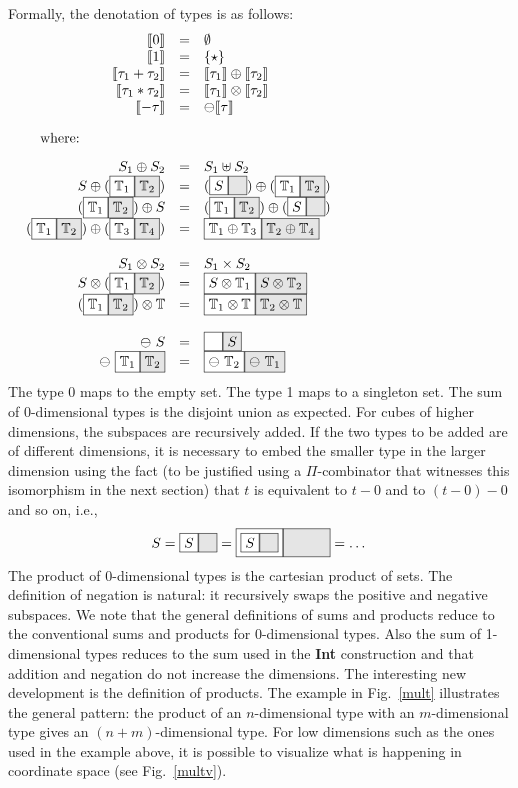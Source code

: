 \documentclass[authoryear,preprint]{sigplanconf}
\newcommand{\cubt}{\mathbb{T}}
\newcommand{\den}[1]{\llbracket #1 \rrbracket}
\newcommand{\nodet}[2]{\fcolorbox{black}{white}{$#1$}\fcolorbox{black}{gray!20}{$#2$}}
\begin{document}
Formally, the denotation of types is as follows:
\[\begin{array}{rcl}
\den{0} &=& \emptyset \\
\den{1} &=& \{ \star \} \\
\den{\tau_1 + \tau_2} &=& \den{\tau_1} \oplus \den{\tau_2} \\
\den{\tau_1 * \tau_2} &=& \den{\tau_1} \otimes \den{\tau_2} \\
\den{- \tau} &=& \ominus \den{\tau} \\
\\
\noalign{\mbox{where:}\hfill}
\\
S_1 \oplus S_2 &=& S_1 \uplus S_2 \\
S \oplus (\nodet{\cubt_1}{\cubt_2}) &=& 
  (\nodet{S}{\phantom{S}}) \oplus (\nodet{\cubt_1}{\cubt_2}) \\
(\nodet{\cubt_1}{\cubt_2}) \oplus S &=& 
  (\nodet{\cubt_1}{\cubt_2}) \oplus (\nodet{S}{\phantom{S}}) \\
(\nodet{\cubt_1}{\cubt_2}) \oplus (\nodet{\cubt_3}{\cubt_4}) &=& 
  \nodet{\cubt_1 \oplus \cubt_3}{\cubt_2 \oplus \cubt_4} \\
\\
S_1 \otimes S_2 &=& S_1 \times S_2 \\
S \otimes (\nodet{\cubt_1}{\cubt_2}) &=& 
  \nodet{S \otimes \cubt_1}{S \otimes \cubt_2} \\
(\nodet{\cubt_1}{\cubt_2}) \otimes \cubt &=& 
  \nodet{\cubt_1 \otimes \cubt}{\cubt_2 \otimes \cubt} \\
\\
\ominus~S &=& \nodet{\phantom{S}}{S} \\
\ominus~\nodet{\cubt_1}{\cubt_2} &=& \nodet{\ominus~\cubt_2}{\ominus~\cubt_1} 
\end{array}\]
The type 0 maps to the empty set. The type 1 maps to a singleton set. The sum
of $0$-dimensional types is the disjoint union as expected. For cubes of
higher dimensions, the subspaces are recursively added. If the two types to
be added are of different dimensions, it is necessary to embed the smaller
type in the larger dimension using the fact (to be justified using a
$\Pi$-combinator that witnesses this isomorphism in the next section) that
$t$ is equivalent to $t-0$ and to $(t-0)-0$ and so on, i.e.,
\[
S = \nodet{S}{\phantom{S}} = 
  \nodet{\nodet{S}{\phantom{S}}}
        {\phantom{{\nodet{S}{\phantom{S}}}}} = \ldots \\
\]
The product of 0-dimensional types is the cartesian product of sets. The
definition of negation is natural: it recursively swaps the positive and
negative subspaces. We note that the general definitions of sums and products
reduce to the conventional sums and products for $0$-dimensional types. Also
the sum of 1-dimensional types reduces to the sum used in the \textbf{Int}
construction and that addition and negation do not increase the
dimensions. The interesting new development is the definition of
products. The example in Fig.~\ref{mult} illustrates the general pattern: the
product of an $n$-dimensional type with an $m$-dimensional type gives an
$(n+m)$-dimensional type. For low dimensions such as the ones used in the
example above, it is possible to visualize what is happening in coordinate
space (see Fig.~\ref{multv}).
\end{document}
